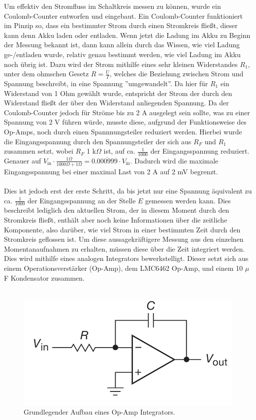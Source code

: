 \documentclass[12pt,a4paper,bibliography=totocnumbered,listof=totocnumbered]{article}
\begin{document}
Um effektiv den Stromfluss im Schaltkreis messen zu können, wurde ein Coulomb-Counter entworfen und eingebaut.
Ein Coulomb-Counter funktioniert im Pinzip so, dass ein bestimmter Strom durch einen Stromkreis fließt, dieser kann denn Akku laden oder entladen. Wenn jetzt die Ladung im Akku zu Beginn der Messung bekannt ist, dann kann allein durch das Wissen, wie viel Ladung ge-/entladen wurde, relativ genau bestimmt werden, wie viel Ladung im Akku noch übrig ist. Dazu wird der Strom mithilfe eines sehr kleinen Widerstandes $R_1$, unter dem ohmschen Gesetz $R = \frac{U}{I}$, welches die Beziehung zwischen Strom und Spannung beschreibt, in eine Spannung ''umgewandelt''. Da hier für $R_1$ ein Widerstand von 1 Ohm gewählt wurde, entspricht der Strom der durch den Widerstand fließt der über den Widerstand anliegenden Spannung. Da der Coulomb-Counter jedoch für Ströme bis zu 2 A ausgelegt sein sollte, was zu einer Spannung von 2 V führen würde, musste diese, aufgrund der Funktionsweise des Op-Amps, noch durch einen Spannnungsteiler reduziert werden. Hierbei wurde die Eingangsspannung durch den Spannungsteiler der sich aus $R_F$ und $R_1$ zusammen setzt, wobei $R_F$ 1 k$\Omega$ ist, auf ca. $\frac{1}{1000}$ der Eingangsspannung reduziert. Genauer auf $V_{\text{in}} \cdot \frac{1 \Omega}{1000 \Omega + 1 \Omega} = 0.\overline{000999} \cdot V_{\text{in}}$. Dadurch wird die maximale Eingangsspannung bei einer maximal Last von 2 A auf 2 mV begrenzt.\\\\
Dies ist jedoch erst der erste Schritt, da bis jetzt nur eine Spannung äquivalent zu ca. $\frac{1}{1000}$ der Eingangsspannung an der Stelle $E$ gemessen werden kann. Dies beschreibt lediglich den aktuellen Strom, der in diesem Moment durch den Stromkreis fließt, enthält aber noch keine Informationen über die zeitliche Komponente, also darüber, wie viel Strom in einer bestimmten Zeit durch den Stromkreis geflossen ist. Um diese aussagekräftigere Messung aus den einzelnen Momentanaufnahmen zu erhalten, müssen diese über die Zeit integriert werden. Dies wird mithilfe eines analogen Integrators bewerkstelligt. Dieser setzt sich aus einem Operationsverstärker (Op-Amp), dem LMC6462 Op-Amp, und einem 10 $\mu$F Kondensator zusammen.\\\\
\begin{figure}[htpb]
    \centering
    \includegraphics[width=0.5\linewidth,keepaspectratio=true]{pics/analog_integrator.png}
    \caption{Grundlegender Aufbau eines Op-Amp Integrators. \cite{aoe}}
    \label{fig:analog_integrator}    
\end{figure}
\end{document}
